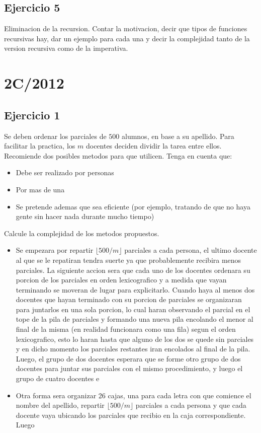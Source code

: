 \documentclass[10pt, a4paper]{report}
\begin{document}
\subsection*{Ejercicio 5}
Eliminacion de la recursion. Contar la motivacion, decir que tipos de funciones recursivas hay, dar un ejemplo para cada una y decir la complejidad tanto de la version recursiva como de la imperativa.

\newpage
\section{2C/2012}

\subsection*{Ejercicio 1}

Se deben ordenar los parciales de $500$ alumnos, en base a su apellido. Para facilitar la practica, los $m$ docentes deciden dividir la tarea entre ellos. Recomiende dos posibles metodos para que utilicen. Tenga en cuenta que:
\begin{itemize}
 \item Debe ser realizado por personas
 \item Por mas de una
 \item Se pretende ademas que sea eficiente (por ejemplo, tratando de que no haya gente sin hacer nada durante mucho tiempo)
\end{itemize}

Calcule la complejidad de los metodos propuestos.

\begin{itemize}
 \item Se empezara por repartir $\lfloor500/m\rfloor$ parciales a cada persona, el ultimo docente al que se le repatiran tendra suerte ya que probablemente recibira menos parciales. La siguiente accion sera que cada uno de los docentes ordenara su porcion de los parciales en orden lexicografico y a medida que vayan terminando se moveran de lugar para explicitarlo. Cuando haya al menos dos docentes que hayan terminado con su porcion de parciales se organizaran para juntarlos en una sola porcion, lo cual haran observando el parcial en el tope de la pila de parciales y formando una nueva pila encolando el menor al final de la misma (en realidad funcionara como una fila) segun el orden lexicografico, esto lo haran hasta que alguno de los dos se quede sin parciales y en dicho momento los parciales restantes iran encolados al final de la pila. Luego, el grupo de dos docentes esperara que se forme otro grupo de dos docentes para juntar sus parciales con el mismo procedimiento, y luego el grupo de cuatro docentes e
 
 \item Otra forma sera organizar 26 cajas, una para cada letra con que comience el nombre del apellido, repartir $\lfloor500/m\rfloor$ parciales a cada persona y que cada docente vaya ubicando los parciales que recibio en la caja correspondiente. Luego
\end{itemize}
\end{document}

